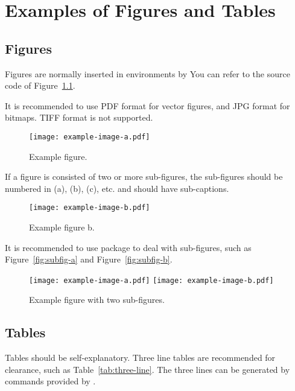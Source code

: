 
\chapter{Examples of Figures and Tables}

\section{Figures}

Figures are normally inserted in  environments by 
You can refer to the source code of Figure~\ref{fig:example}.

It is recommended to use PDF format for vector figures, and JPG format for bitmaps. TIFF format is not supported.

\begin{figure}
  \centering
  \texttt{[image: example-image-a.pdf]}
  \caption{Example figure.}
  \label{fig:example}
\end{figure}

If a figure is consisted of two or more sub-figures, the sub-figures should be numbered in (a), (b), (c), etc. and should have sub-captions.

\begin{figure}
  \centering
  \texttt{[image: example-image-b.pdf]}
  \caption{Example figure b.}
  \label{fig:example-b}
\end{figure}

It is recommended to use  package to deal with sub-figures, such as Figure~\ref{fig:subfig-a} and Figure~\ref{fig:subfig-b}.

\begin{figure}
  \centering
    {\texttt{[image: example-image-a.pdf]}}
    {\texttt{[image: example-image-b.pdf]}}
  \caption{Example figure with two sub-figures.}
  \label{fig:multi-image}
\end{figure}



\section{Tables}

Tables should be self-explanatory. Three line tables are recommended for clearance, such as Table~\ref{tab:three-line}. The three lines can be generated by commands provided by .

